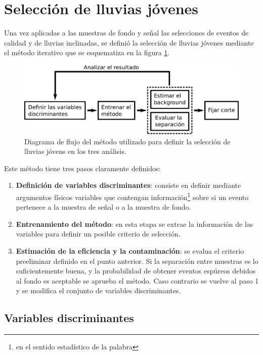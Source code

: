 \section{Selecci\'on de lluvias j\'ovenes}
	
	Una vez aplicadas a las muestras de fondo y señal las selecciones de eventos de calidad y de lluvias inclinadas, se definió la selección de lluvias jóvenes mediante el método iterativo que se esquematiza en la figura \ref{fig:entrenamiento}.
	\begin{figure}[ht!]
		\begin{center}
		\includegraphics[width=1.0\textwidth]{fig/seleccionAuger/entrenamiento}
		\caption{Diagrama de flujo del método utilizado para definir la selección de lluvias jóvens en los tres análisis.}
		\label{fig:entrenamiento}
		\end{center}
	\end{figure}
	Este método tiene tres pasos claramente definidos:
	\begin{enumerate}
	 \item \textbf{Definición de variables discriminantes}: consiste en definir mediante argumentos físicos variables que contengan información\footnote{en el sentido estadístico de la palabra} sobre si un evento pertenece a la muestra de señal o a la muestra de fondo.
	 \item \textbf{Entrenamiento del método}: en esta etapa se extrae la información de las variables para definir un posible criterio de selección. 
	 \item \textbf{Estimación de la eficiencia y la contaminación}: se evalua el criterio preeliminar definido en el punto anterior. Si la separación entre muestras es lo suficientemente buena, y la probabilidad de obtener eventos espúreos debidos al fondo es aceptable se aprueba el método. Caso contrario se vuelve al paso 1 y se modifica el conjunto de variables discriminantes.
	\end{enumerate}
	\subsection{Variables discriminantes}
	\label{sbsc:discVars}
	

